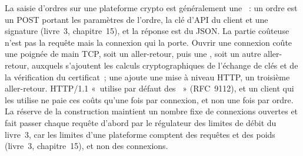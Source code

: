 La saisie d'ordres sur une plateforme crypto est généralement une ~: un ordre est un POST portant les paramètres de l'ordre, la clé d'API du client
et une signature (livre~3, chapitre~15), et la réponse est du JSON. La partie coûteuse n'est pas la requête mais la connexion qui la porte. Ouvrir une connexion coûte
une poignée de main TCP, soit un aller-retour, puis une , soit un autre aller-retour, auxquels s'ajoutent les calculs cryptographiques de l'échange de clés
et de la vérification du certificat~; une  ajoute une mise à niveau HTTP, un troisième aller-retour. HTTP/1.1 «~utilise par défaut des ~» (RFC~9112), et
un client qui les utilise ne paie ces coûts qu'une fois par connexion, et non une fois par ordre.
La réserve de la construction maintient un nombre fixe de connexions ouvertes et fait passer chaque requête d'abord par le régulateur des limites de débit du livre~3,
car les limites d'une plateforme comptent des requêtes et des poids (livre~3, chapitre~15), et non des connexions.


